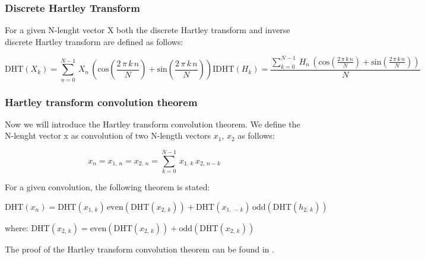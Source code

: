 \documentclass[12pt,twoside,a4paper]{article}
\numberwithin{equation}{subsection}
\numberwithin{figure}{subsection}
\begin{document}
\subsubsection*{Discrete Hartley Transform}

For a given N-lenght vector X both the discrete Hartley transform and inverse discrete Hartley transform are defined as follows:

\begin{subequations} \label{eq:fhta_definition}
  \begin{equation}   \label{eq:fhtadef_dht}
    \mathrm{DHT}({X_{k}})=\sum_{n=0}^{N - 1}\,{X_{n}}\,(\mathrm{cos}(\frac {2\,\pi \,k\,n}{N}) + \mathrm{sin}(\frac {2\,\pi
    \,k\,n}{N}))
  \end{equation}
  \begin{equation}   \label{eq:fhtadef_idht}
    \mathrm{IDHT}({H_{k}})=\frac {\sum_{k=0}^{N - 1}\,{H_{n}}\,(\mathrm{cos}(\frac {2\,\pi \,k\,n}{N}) + \mathrm{sin}(\frac {2\,\pi
    \,k\,n}{N}))}{N}  
  \end{equation}
\end{subequations}

\subsubsection*{Hartley transform convolution theorem}

Now we will introduce the Hartley transform convolution theorem. We define the N-lenght vector x as convolution of two N-length
vectors ${x_{1}}$, ${x_{2}}$ as follows:

\begin{equation} \label{eq:hartley_convolution}
  {x_{n}}={x_{1, \,n}} = {x_{2, \,n}} = \sum_{k=0}^{N - 1}\,{x_{1, \,k}}\,{x_{2, \,n - k}} 
\end{equation}

For a given convolution, the following theorem is stated:

\begin{equation} \label{eq:hartley_theorem}
  \mathrm{DHT}({x_{n}})=\mathrm{DHT}({x_{1, \,k}})\,\mathrm{even}(\mathrm{DHT}({x_{2, \,k}})) + \mathrm{DHT}({x_{1, \, -
  k}})\,\mathrm{odd}(\mathrm{DHT}({h_{2, \,k}}))
\end{equation}

where: $\mathrm{DHT}({x_{2, \,k}})=\mathrm{even}(\mathrm{DHT}({x_{2, \,k}})) + \mathrm{odd}(\mathrm{DHT}({x_{2, \,k}}))$%

The proof of the Hartley transform convolution theorem can be found in \cite{chang_computation}. 
\end{document}
